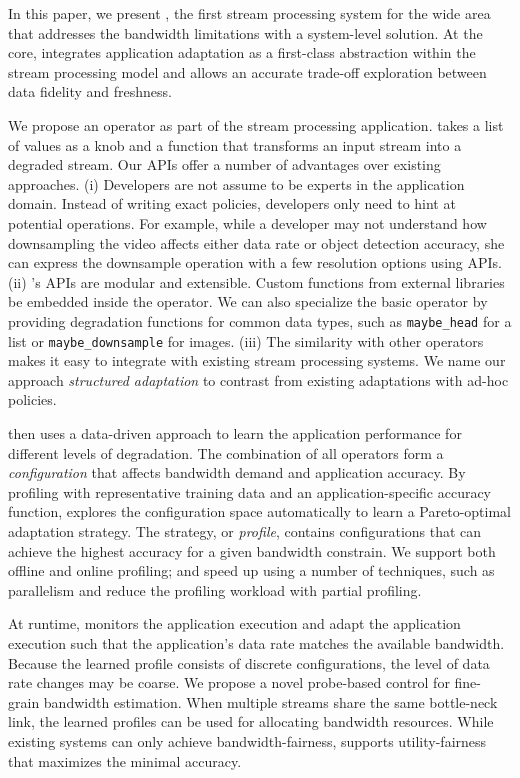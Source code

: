 In this paper, we present \sysname{}, the first stream processing system for the
wide area that addresses the bandwidth limitations with a system-level
solution. At the core, \sysname{} integrates application adaptation as a
first-class abstraction within the stream processing model and allows an
accurate trade-off exploration between data fidelity and freshness.

We propose an \maybe{} operator as part of the stream processing
application. \maybe{} takes a list of values as a knob and a function that
transforms an input stream into a degraded stream. Our APIs offer a number of
advantages over existing approaches. (i) Developers are not assume to be experts
in the application domain. Instead of writing exact policies, developers only
need to hint at potential operations. For example, while a developer may not
understand how downsampling the video affects either data rate or object
detection accuracy, she can express the downsample operation with a few
resolution options using \maybe APIs. (ii) \sysname{}'s APIs are modular and
extensible. Custom functions from external libraries be embedded inside the
operator. We can also specialize the basic operator by providing degradation
functions for common data types, such as \texttt{maybe\_head} for a list or
\texttt{maybe\_downsample} for images.  (iii) The similarity with other
operators makes it easy to integrate with existing stream processing systems.
We name our approach \textit{structured adaptation} to contrast from existing
adaptations with ad-hoc policies.

\sysname{} then uses a data-driven approach to learn the application performance
for different levels of degradation. The combination of all \maybe{} operators
form a \textit{configuration} that affects bandwidth demand and application
accuracy. By profiling with representative training data and an
application-specific accuracy function, \sysname{} explores the configuration
space automatically to learn a Pareto-optimal adaptation strategy. The strategy,
or \textit{profile}, contains configurations that can achieve the highest
accuracy for a given bandwidth constrain. We support both offline and online
profiling; and speed up using a number of techniques, such as parallelism and
reduce the profiling workload with partial profiling.

At runtime, \sysname{} monitors the application execution and adapt the
application execution such that the application's data rate matches the
available bandwidth. Because the learned profile consists of discrete
configurations, the level of data rate changes may be coarse. We propose a novel
probe-based control for fine-grain bandwidth estimation. When multiple streams
share the same bottle-neck link, the learned profiles can be used for allocating
bandwidth resources. While existing systems can only achieve bandwidth-fairness,
\sysname{} supports utility-fairness that maximizes the minimal accuracy.

